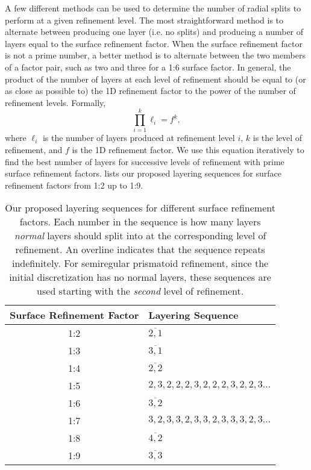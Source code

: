 A few different methods can be used to determine the number of radial splits to perform at a given refinement level.
The most straightforward method is to alternate between producing one layer (i.e. no splits) and producing a number of layers equal to the surface refinement factor.
When the surface refinement factor is not a prime number, a better method is to alternate between the two members of a factor pair, such as two and three for a 1:6 surface factor.
In general, the product of the number of layers at each level of refinement should be equal to (or as close as possible to) the 1D refinement factor to the power of the number of refinement levels.
Formally,
%
\begin{equation*}
\prod_{i = 1}^{k} \ell_{i} = f^{k},
\end{equation*}
%
where $\ell_{i}$ is the number of layers produced at refinement level $i$, $k$ is the level of refinement, and $f$ is the 1D refinement factor.
We use this equation iteratively to find the best number of layers for successive levels of refinement with prime surface refinement factors.
 lists our proposed layering sequences for surface refinement factors from 1:2 up to 1:9.


\begin{table}[ht!]
	\centering
	\caption[Layering sequences for different surface refinement factors]{
		Our proposed layering sequences for different surface refinement factors.
		Each number in the sequence is how many layers \textit{normal} layers should split into at the corresponding level of refinement.
		An overline indicates that the sequence repeats indefinitely.
		For semiregular prismatoid refinement, since the initial discretization has no normal layers, these sequences are used starting with the \textit{second} level of refinement.
	}
	\begin{tabular}{@{} c l @{}}
		\toprule
		Surface Refinement Factor & Layering Sequence         \\ \midrule
		1:2                  & $\overline{2,1}$               \\
		1:3                  & $\overline{3,1}$               \\
		1:4                  & $\overline{2,2}$               \\
		1:5                  & $2,3,2,2,2,3,2,2,2,3,2,2,3...$ \\
		1:6                  & $\overline{3,2}$               \\
		1:7                  & $3,2,3,3,2,3,3,2,3,3,3,2,3...$ \\
		1:8                  & $\overline{4,2}$               \\
		1:9                  & $\overline{3,3}$               \\ \bottomrule
	\end{tabular}
	\label{tab:layers}
\end{table}



